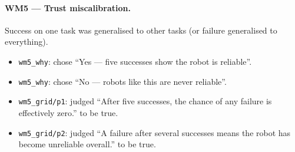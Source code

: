 \paragraph{WM5 --- Trust miscalibration.} Success on one task was generalised to other tasks (or failure generalised to everything).
\begin{itemize}
\item \texttt{wm5\_why}: chose \textquotedblleft{}Yes --- five successes show the robot is reliable\textquotedblright{}.
\item \texttt{wm5\_why}: chose \textquotedblleft{}No --- robots like this are never reliable\textquotedblright{}.
\item \texttt{wm5\_grid/p1}: judged \textquotedblleft{}After five successes, the chance of any failure is effectively zero.\textquotedblright{} to be true.
\item \texttt{wm5\_grid/p2}: judged \textquotedblleft{}A failure after several successes means the robot has become unreliable overall.\textquotedblright{} to be true.
\end{itemize}

